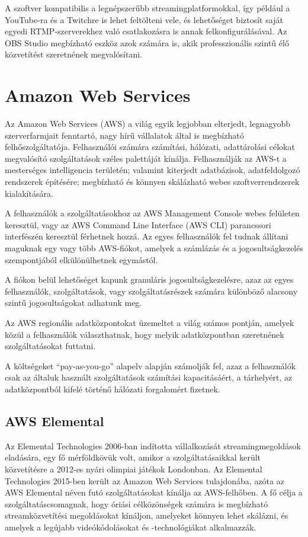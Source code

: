 A szoftver kompatibilis a legnépszerűbb streamingplatformokkal, így például a YouTube-ra és a Twitchre is lehet feltölteni vele, és lehetőséget biztosít saját egyedi RTMP-szerverekhez való csatlakozásra is annak felkonfigurálásával. Az OBS Studio megbízható eszköz azok számára is, akik professzionális szintű élő közvetítést szeretnének megvalósítani.

\section{Amazon Web Services}

Az Amazon Web Services (AWS) a világ egyik legjobban elterjedt, legnagyobb szerverfarmjait fenntartó, nagy hírű vállalatok által is megbízható felhőszolgáltatója. Felhasználói számára számítási, hálózati, adattárolási célokat megvalósító szolgáltatások széles palettáját kínálja. Felhasználják az AWS-t a mesterséges intelligencia területén; valamint kiterjedt adatbázisok, adatfeldolgozó rendszerek építésére; megbízható és könnyen skálázható webes szoftverrendszerek kialakítására.

A felhasználók a szolgáltatásokhoz az AWS Management Console webes felületen keresztül, vagy az AWS Command Line Interface (AWS CLI) parancssori interfészén keresztül férhetnek hozzá. Az egyes felhasználók fel tudnak állítani maguknak egy vagy több AWS-fiókot, amelyek a számlázás és a jogosultságkezelés szempontjából elkülönülhetnek egymástól.

A fiókon belül lehetőséget kapunk granuláris jogosultságkezelésre, azaz az egyes felhasználók, szolgáltatások, vagy szolgáltatásrészek számára különböző alacsony szintű jogosultságokat adhatunk meg.

Az AWS regionális adatközpontokat üzemeltet a világ számos pontján, amelyek közül a felhasználók választhatnak, hogy melyik adatközpontban szeretnének szolgáltatásokat futtatni.

A költségeket ``pay-as-you-go'' alapelv alapján számolják fel, azaz a felhasználók csak az általuk használt szolgáltatások számítási kapacitásáért, a tárhelyért, az adatközpontból kifelé történő hálózati forgalomért fizetnek.

\subsection{AWS Elemental}

Az Elemental Technologies 2006-ban indította vállalkozását streamingmegoldások eladására, egy fő mérföldkövük volt, amikor a szolgáltatásaikkal került közvetítésre a 2012-es nyári olimpiai játékok Londonban. Az Elemental Technologies 2015-ben került az Amazon Web Services tulajdonába, azóta az AWS Elemental néven futó szolgáltatásokat kínálja az AWS-felhőben. A fő célja a szolgáltatáscsomagnak, hogy óriási célközönségek számára is megbízható streamközvetítési megoldásokat kínáljon, amelyeket könnyen lehet skálázni, és amelyek a legújabb videókódolásokat és -technológiákat alkalmazzák. \cite{Elemental}

